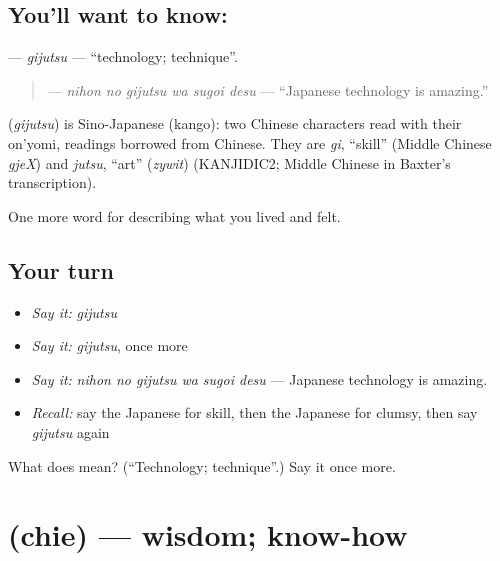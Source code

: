 \subsection*{You'll want to know: }
\textbf{} — \emph{gijutsu} — \textquotedblleft{}technology; technique\textquotedblright{}.

\begin{quote}
\textbf{  } — \emph{nihon no gijutsu wa sugoi desu} — \textquotedblleft{}Japanese technology is amazing.\textquotedblright{}
\end{quote}

\begin{cousinweb}
\textbf{} (\emph{gijutsu}) is Sino-Japanese (kango): two Chinese characters read with their on'yomi, readings borrowed from Chinese. They are \emph{gi}, \textquotedblleft{}skill\textquotedblright{} (Middle Chinese \emph{gjeX}) and \emph{jutsu}, \textquotedblleft{}art\textquotedblright{} (\emph{zywit}) (KANJIDIC2; Middle Chinese in Baxter's transcription).
\end{cousinweb}

\begin{grammarlens}[title={What you've built}]
One more word for describing what you lived and felt.
\end{grammarlens}

\subsection*{Your turn}
\begin{itemize}
\raggedright
  \item \emph{Say it:} \emph{gijutsu}
  \item \emph{Say it:} \emph{gijutsu}, once more
  \item \emph{Say it:} \emph{nihon no gijutsu wa sugoi desu} — Japanese technology is amazing.
  \item \emph{Recall:} say the Japanese for skill, then the Japanese for clumsy, then say \emph{gijutsu} again
\end{itemize}

\begin{tcolorbox}[breakable,colback=teal!4,colframe=teal!35!black,title={Before you move on}]
What does  mean? (\textquotedblleft{}Technology; technique\textquotedblright{}.) Say it once more.
\end{tcolorbox}
\section[\texorpdfstring{\ja{ちえ} (chie)}{ちえ (chie)}]{ (chie) — wisdom; know-how}

